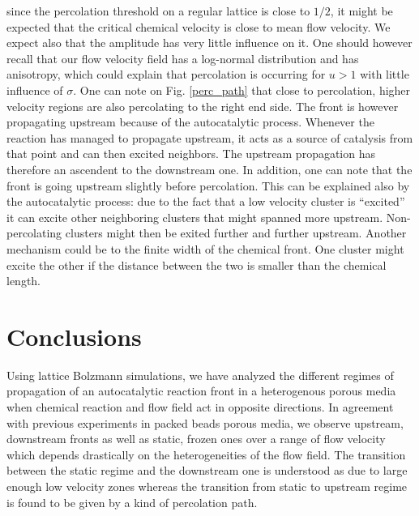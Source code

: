 \documentclass[doublecol]{epl2}
\begin{document}
since the percolation threshold on a regular lattice is close to $1/2$, it might be expected that the critical chemical velocity is close to mean flow velocity. We expect also that the amplitude has very little influence on it. One should however recall that our flow  velocity field has a log-normal distribution and has anisotropy, which could explain that percolation is occurring for $u>1$ with little influence of $\sigma$.
One can note on Fig. \ref{perc_path} that close to percolation, higher velocity regions are also percolating to the right end side. The front is however propagating upstream because of the autocatalytic process. Whenever the reaction has managed to propagate upstream, it acts as a source of catalysis from that point and can then excited neighbors. The upstream propagation has therefore an ascendent to the downstream one.
In addition, one can note that the front is going upstream slightly before percolation. This can be explained also by the autocatalytic process: due to the fact that a low velocity cluster is ``excited'' it can excite other neighboring clusters that might spanned more upstream. Non-percolating clusters might then be exited further and further upstream.
Another mechanism could be to the finite width of the chemical front. One cluster might excite the other if the distance between the two is smaller than the chemical length.


\section{Conclusions}
Using lattice Bolzmann simulations, we have analyzed the different regimes of propagation of an autocatalytic reaction front in a heterogenous porous media when chemical reaction and flow field act in opposite directions. In agreement with previous experiments in packed beads porous media, we observe upstream, downstream fronts as well as static, frozen ones over a range of flow velocity which depends drastically on the heterogeneities of the flow field. The transition between the static regime and the downstream one is understood as due to large enough low velocity zones whereas the transition from static to upstream regime is found to be given by a kind of percolation path.




 	
	
\end{document}
